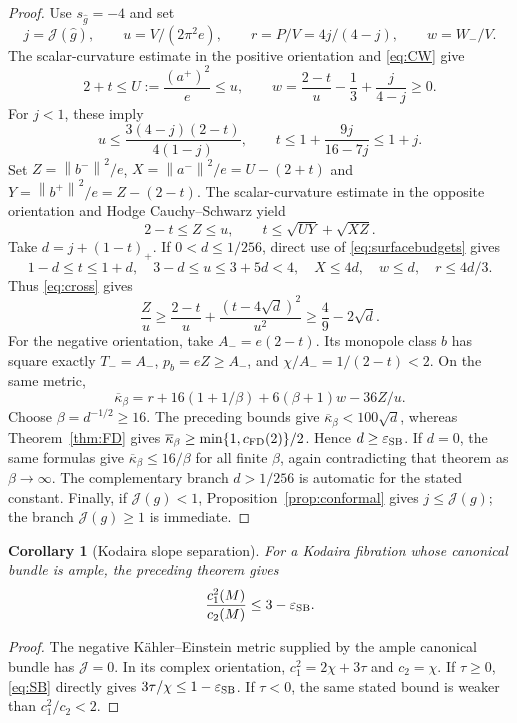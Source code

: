 \documentclass[11pt,a4paper]{article}
\newtheorem{corollary}[theorem]{Corollary}
\theoremstyle{definition}
\theoremstyle{remark}
\newcommand{\J}{\mathcal J}
\newcommand{\norm}[1]{\left\lVert#1\right\rVert}
\begin{document}
\begin{proof}
Use $s_{\widehat g}=-4$ and set
\[
 j=\J(\widehat g),\qquad u=V/(2\pi^2e),\qquad
 r=P/V=4j/(4-j),\qquad w=W_-/V.
\]
The scalar-curvature estimate in the positive orientation and \eqref{eq:CW} give
\begin{equation}
 2+t\le U:=\frac{(a^+)^2}{e}\le u,\qquad
 w=\frac{2-t}{u}-\frac13+\frac{j}{4-j}\ge0.
 \label{eq:surfacebudgets}
\end{equation}
For $j<1$, these imply
\[
 u\le\frac{3(4-j)(2-t)}{4(1-j)},\qquad
 t\le1+\frac{9j}{16-7j}\le1+j.
\]
Set $Z=\norm{b^-}^2/e$, $X=\norm{a^-}^2/e=U-(2+t)$ and
$Y=\norm{b^+}^2/e=Z-(2-t)$. The scalar-curvature estimate in the opposite orientation and Hodge Cauchy--Schwarz yield
\begin{equation}
 2-t\le Z\le u,\qquad t\le\sqrt{UY}+\sqrt{XZ}.
 \label{eq:cross}
\end{equation}
Take $d=j+(1-t)_+$. If $0<d\le1/256$, direct use of \eqref{eq:surfacebudgets} gives
\[
 1-d\le t\le1+d,\quad 3-d\le u\le3+5d<4,
 \quad X\le4d,\quad w\le d,\quad r\le4d/3.
\]
Thus \eqref{eq:cross} gives
\begin{equation}
 \frac Zu\ge\frac{2-t}{u}+\frac{(t-4\sqrt d)^2}{u^2}
 \ge\frac49-2\sqrt d.
 \label{eq:Zlower}
\end{equation}
For the negative orientation, take $A_-=e(2-t)$. Its monopole class $b$ has square exactly $T_- = A_-$, $p_b=eZ\ge A_-$, and $\chi/A_-=1/(2-t)<2$. On the same metric,
\[
 \overline\kappa_\beta
 =r+16(1+1/\beta)+6(\beta+1)w-36Z/u.
\]
Choose $\beta=d^{-1/2}\ge16$. The preceding bounds give $\overline\kappa_\beta<100\sqrt d$, whereas Theorem~\ref{thm:FD} gives
$\overline\kappa_\beta\ge\min\{1,c_{\rm FD}(2)\}/2$.
Hence $d\ge\varepsilon_{\rm SB}$. If $d=0$, the same formulas give $\overline\kappa_\beta\le16/\beta$ for all finite $\beta$, again contradicting that theorem as $\beta\to\infty$. The complementary branch $d>1/256$ is automatic for the stated constant. Finally, if $\J(g)<1$, Proposition~\ref{prop:conformal} gives $j\le\J(g)$; the branch $\J(g)\ge1$ is immediate.
\end{proof}

\begin{corollary}[Kodaira slope separation]\label{cor:Kodaira}
For a Kodaira fibration whose canonical bundle is ample, the preceding theorem gives
\begin{equation}
 \frac{c_1^2(M)}{c_2(M)}\le3-\varepsilon_{\rm SB}.
 \label{eq:Kodaira}
\end{equation}
\end{corollary}
\begin{proof}
The negative K\"ahler--Einstein metric supplied by the ample canonical bundle has $\J=0$. In its complex orientation, $c_1^2=2\chi+3\tau$ and $c_2=\chi$. If $\tau\ge0$, \eqref{eq:SB} directly gives $3\tau/\chi\le1-\varepsilon_{\rm SB}$. If $\tau<0$, the same stated bound is weaker than $c_1^2/c_2<2$.
\end{proof}
\end{document}
